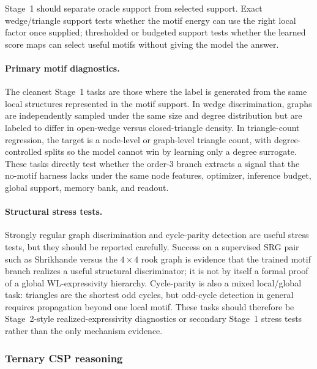 \documentclass[11pt,a4paper]{article}
\begin{document}
Stage~1 should separate oracle support from selected support. Exact
wedge/triangle support tests whether the motif energy can use the right local
factor once supplied; thresholded or budgeted support tests whether the learned
score maps can select useful motifs without giving the model the answer.

\paragraph{Primary motif diagnostics.}
The cleanest Stage~1 tasks are those where the label is generated from the
same local structures represented in the motif support. In wedge
discrimination, graphs are independently sampled under the same size and
degree distribution but are labeled to differ in open-wedge versus
closed-triangle density. In triangle-count regression, the target is a
node-level or graph-level triangle count, with degree-controlled splits so the
model cannot win by learning only a degree surrogate. These tasks directly
test whether the order-3 branch extracts a signal that the no-motif harness lacks under
the same node features, optimizer, inference budget, global support, memory
bank, and readout.

\paragraph{Structural stress tests.}
Strongly regular graph discrimination and cycle-parity detection are useful
stress tests, but they should be reported carefully. Success on a supervised
SRG pair such as Shrikhande versus the $4\times4$ rook graph is evidence that
the trained motif branch realizes a useful structural discriminator; it is not
by itself a formal proof of a global WL-expressivity hierarchy. Cycle-parity
is also a mixed local/global task: triangles are the shortest odd cycles, but
odd-cycle detection in general requires propagation beyond one local motif.
These tasks should therefore be Stage~2-style realized-expressivity
diagnostics or secondary Stage~1 stress tests rather than the only mechanism
evidence.

\subsubsection{Ternary CSP reasoning}
\label{sec:ternary-csp}
\end{document}

